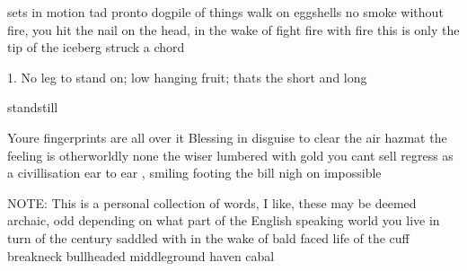 \begin{center}
\end{center}

sets in motion
tad
pronto
dogpile of things
walk on eggshells
no smoke without fire, you hit the nail on the head, in the wake of
fight fire with fire
this is only the tip of the iceberg
struck a chord

1. No leg to stand on; low hanging fruit; thats the short and long

standstill

Youre fingerprints are all over it
Blessing in disguise
to clear the air
hazmat
the feeling is otherworldly
none the wiser
lumbered with gold you cant sell
regress as a civillisation
ear to ear , smiling
footing the bill
nigh on impossible

NOTE: This is a personal collection of words, I like, these may be deemed archaic, odd depending on what part of the English speaking world you live in
turn of the century
saddled with
in the wake of
bald faced life
of the cuff
breakneck
bullheaded
middleground
haven
cabal

